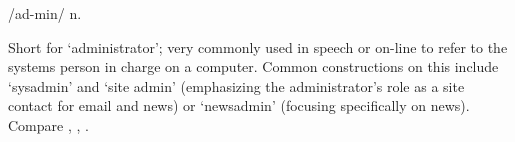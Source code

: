  /ad-min/ n.

Short for `administrator'; very commonly used in speech or on-line to refer to the systems person in charge on a computer. Common
constructions on this include `sysadmin' and `site admin' (emphasizing the administrator's role as a site contact for email and news) or
`newsadmin' (focusing specifically on news). Compare , , .

